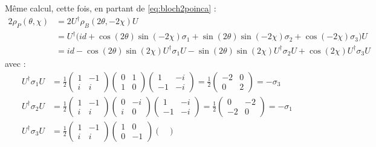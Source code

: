 \begin{annexe}
Même calcul, cette fois, en partant de \eqref{eq:bloch2poinca} :
\begin{align*}
	2\rho_P(\theta, \chi) &= 2U^\dagger \rho_B(2\theta, -2\chi) U \\
	&= U^\dagger \Big( id + \cos(2\theta) \sin(-2\chi) \sigma_1 + \sin(2\theta) \sin(-2\chi) \sigma_2 + \cos (-2\chi) \sigma_3 \Big) U \\
	&= id - \cos(2\theta) \sin(2\chi) U^\dagger \sigma_1 U - \sin(2\theta) \sin(2\chi) U^\dagger \sigma_2 U + \cos (2\chi) U^\dagger \sigma_3 U
\end{align*}
avec :
\begin{align*}
	U^\dagger \sigma_1 U &= \frac{1}{2} \begin{pmatrix} 
		1 & -1 \\ i & i
	\end{pmatrix} \begin{pmatrix} 
		0 & 1 \\ 1 &  0 
	\end{pmatrix} \begin{pmatrix} 
		1 & -i \\ -1 & -i
	\end{pmatrix} = \frac{1}{2} \begin{pmatrix} 
		-2 & 0 \\ 0 & 2
	\end{pmatrix} = -\sigma_3 \\
	U^\dagger \sigma_2 U &= \frac{1}{2} \begin{pmatrix} 
		1 & -1 \\ i & i
	\end{pmatrix} \begin{pmatrix} 
		0 & -i \\  i &  0 
	\end{pmatrix} \begin{pmatrix} 
		1 & -i \\ -1 & -i
	\end{pmatrix} = \frac{1}{2} \begin{pmatrix} 
		0 & -2 \\ -2 & 0
	\end{pmatrix} = -\sigma_1 \\
	U^\dagger \sigma_3 U &= \frac{1}{2} \begin{pmatrix} 
		1 & -1 \\ i & i
	\end{pmatrix}  \begin{pmatrix} 
		1 & 0 \\ 0 & -1 
	\end{pmatrix} \begin{pmatrix} 

\end{pmatrix}
\end{align*}
\end{annexe}
